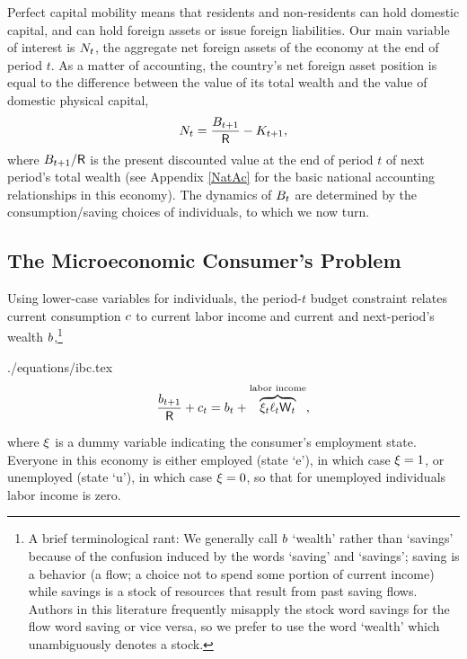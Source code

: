 \documentclass[titlepage,abstract,letterpaper]{econtex}
\begin{document}
Perfect capital mobility means that residents and non-residents can
hold domestic capital, and can hold foreign assets or issue foreign
liabilities. Our main variable of interest is $N_t$, the aggregate
net foreign assets of the economy at the end of period $t$. As a
matter of accounting, the country's net foreign asset position is
equal to the difference between the value of its total wealth and the value of domestic physical capital,
\begin{equation}
N_t = \frac{B_{t+1}}{\mathsf{R}} - K_{t+1},
\label{eq:NFALev}
\end{equation}
where $B_{t+1}/\mathsf{R}$ is the present discounted value at the end of period $t$ of next
period's total wealth (see Appendix \ref{NatAc} for the basic national accounting relationships in this economy). The dynamics of $B_t$ are determined by
the consumption/saving choices of individuals, to which we now turn.

\subsection{The Microeconomic Consumer's Problem}

Using lower-case variables for individuals, the period-$t$ budget
constraint relates current consumption $c$ to
current labor income and current and next-period's wealth $b$,\footnote{A
  brief terminological rant: We generally call $b$ `wealth' rather
  than `savings' because of the confusion induced by the words
  `saving' and `savings'; saving is a behavior (a flow; a choice not
  to spend some portion of current income) while savings is a stock of
  resources that result from past saving flows.  Authors in this
  literature frequently misapply the stock word savings for the flow
  word saving or vice versa, so we prefer to use the word `wealth'
  which unambiguously denotes a stock.}
\begin{verbatimwrite}{./equations/ibc.tex}
\begin{equation}
\frac{b_{t+1}}{\mathsf{R}}+ c_{t}=b_{t}+\overbrace{\xi_{t} \ell_{t} \mathsf{W}_t}^{\text{labor income}},
\label{eq:ibc}
\end{equation}
\end{verbatimwrite}

where $\xi$ is a dummy variable indicating the consumer's
employment state.
Everyone in this economy is either employed (state `e'),
in which case $\xi = 1$, or unemployed (state
`u'), in which case $\xi=0$, so that for unemployed individuals labor income is zero.
\end{document}
